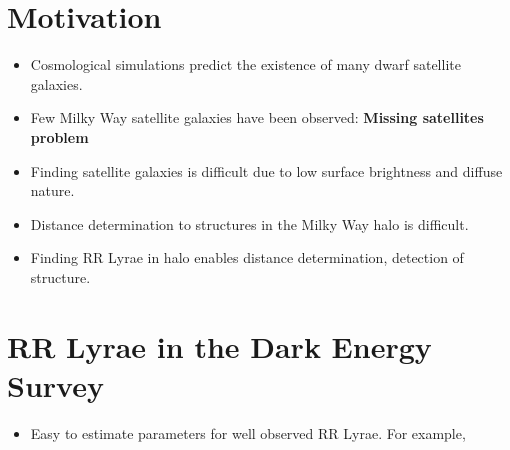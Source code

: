 \documentclass[a0,portrait]{a0poster}
\begin{document}
\begin{multicols}{2} %



\section*{Motivation}

\begin{itemize}
\item Cosmological simulations predict the existence of many dwarf satellite galaxies.
\item Few Milky Way satellite galaxies have been observed: \textbf{Missing satellites problem} \cite{kauffmann1993formation,klypin1999missing,moore1999dark}
\item Finding satellite galaxies is difficult due to low surface brightness and diffuse nature.
\item Distance determination to structures in the Milky Way halo is difficult.
\item Finding RR Lyrae in halo enables distance determination, detection of structure. \cite{baker2015charting}
\end{itemize}



\section*{RR Lyrae in the Dark Energy Survey}

\begin{itemize}
\item Easy to estimate parameters for well observed RR Lyrae. For example,


\end{itemize}
\end{multicols}
\end{document}

